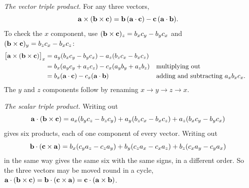 \begin{toolbox}
\emph{The vector triple product.} For any three vectors,
\begin{equation*}
   \bm{\mathrm{a}}\times(\bm{\mathrm{b}}\times\bm{\mathrm{c}})
   = \bm{\mathrm{b}}\,(\bm{\mathrm{a}}\cdot\bm{\mathrm{c}}) - \bm{\mathrm{c}}\,(\bm{\mathrm{a}}\cdot\bm{\mathrm{b}}) .
\end{equation*}
To check the $x$ component, use $(\bm{\mathrm{b}}\times\bm{\mathrm{c}})_z = b_xc_y -
b_yc_x$ and $(\bm{\mathrm{b}}\times\bm{\mathrm{c}})_y = b_zc_x - b_xc_z$:
\begin{align*}
   \bigl[\bm{\mathrm{a}}\times(\bm{\mathrm{b}}\times\bm{\mathrm{c}})\bigr]_x
   &= a_y(b_xc_y - b_yc_x) - a_z(b_zc_x - b_xc_z)\\
   &= b_x(a_yc_y + a_zc_z) - c_x(a_yb_y + a_zb_z)
   && \text{multiplying out}\\
   &= b_x(\bm{\mathrm{a}}\cdot\bm{\mathrm{c}}) - c_x(\bm{\mathrm{a}}\cdot\bm{\mathrm{b}})
   && \text{adding and subtracting $a_xb_xc_x$.}
\end{align*}
The $y$ and $z$ components follow by renaming $x \to y \to z \to x$.

\emph{The scalar triple product.} Writing out
\begin{equation*}
   \bm{\mathrm{a}}\cdot(\bm{\mathrm{b}}\times\bm{\mathrm{c}})
   = a_x(b_yc_z - b_zc_y) + a_y(b_zc_x - b_xc_z) + a_z(b_xc_y - b_yc_x)
\end{equation*}
gives six products, each of one component of every vector. Writing out
\begin{equation*}
   \bm{\mathrm{b}}\cdot(\bm{\mathrm{c}}\times\bm{\mathrm{a}})
   = b_x(c_ya_z - c_za_y) + b_y(c_za_x - c_xa_z) + b_z(c_xa_y - c_ya_x)
\end{equation*}
in the same way gives the same six with
the same signs, in a different order. So the three vectors may be moved
round in a cycle, $\bm{\mathrm{a}}\cdot(\bm{\mathrm{b}}\times\bm{\mathrm{c}}) = \bm{\mathrm{b}}\cdot(\bm{\mathrm{c}}
\times\bm{\mathrm{a}}) = \bm{\mathrm{c}}\cdot(\bm{\mathrm{a}}\times\bm{\mathrm{b}})$.
\end{toolbox}

